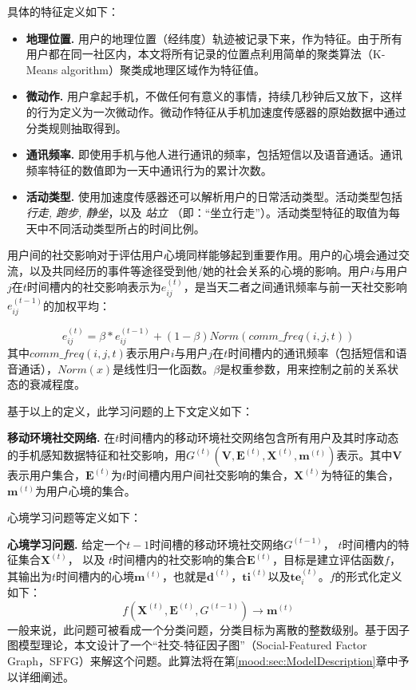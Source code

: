 具体的特征定义如下：
\begin{itemize}
  \item \textbf{地理位置.} 用户的地理位置（经纬度）轨迹被记录下来，作为特征。由于所有用户都在同一社区内，本文将所有记录的位置点利用简单的聚类算法（K-Means algorithm\cite{kmeans}）聚类成地理区域作为特征值。
  \item \textbf{微动作.} 用户拿起手机，不做任何有意义的事情，持续几秒钟后又放下，这样的行为定义为一次微动作。微动作特征从手机加速度传感器的原始数据中通过分类规则抽取得到。
  \item \textbf{通讯频率.} 即使用手机与他人进行通讯的频率，包括短信以及语音通话。通讯频率特征的数值即为一天中通讯行为的累计次数。
  \item \textbf{活动类型.} 使用加速度传感器还可以解析用户的日常活动类型。活动类型包括\textit{行走, 跑步, 静坐}，以及 \textit{站立} （即：``坐立行走''）\cite{activityRecognition}。活动类型特征的取值为每天中不同活动类型所占的时间比例。
\end{itemize}

用户间的社交影响对于评估用户心境同样能够起到重要作用\cite{turner1991social}\cite{eastwick2009game}。用户的心境会通过交流，以及共同经历的事件等途径受到他/她的社会关系的心境的影响。用户$i$与用户$j$在$t$时间槽内的社交影响表示为$e_{ij}^{(t)}$，是当天二者之间通讯频率与前一天社交影响$e_{ij}^{(t-1)}$的加权平均：

\begin{equation}
\label{mood:equ:e}
e_{ij}^{(t)} = \beta \ast e_{ij}^{(t-1)} + (1 - \beta) Norm(comm\_freq(i, j, t))
\end{equation}
其中$comm\_freq(i, j, t)$表示用户$i$与用户$j$在$t$时间槽内的通讯频率（包括短信和语音通话），$Norm(x)$是线性归一化函数。$\beta$是权重参数，用来控制之前的关系状态的衰减程度。

基于以上的定义，此学习问题的上下文定义如下：

\begin{definition}
\textbf{移动环境社交网络.} 在$t$时间槽内的移动环境社交网络包含所有用户及其时序动态的手机感知数据特征和社交影响，用$G^{(t)}(\textbf{V}, \textbf{E}^{(t)}, \textbf{X}^{(t)}, \textbf{m}^{(t)})$表示。其中$\textbf{V}$表示用户集合，$\textbf{E}^{(t)}$为$t$时间槽内用户间社交影响的集合，$\textbf{X}^{(t)}$为特征的集合，$\textbf{m}^{(t)}$为用户心境的集合。
\end{definition}

心境学习问题等定义如下： 

\textbf{心境学习问题.} 给定一个$t-1$时间槽的移动环境社交网络$G^{(t-1)}$， $t$时间槽内的特征集合$\textbf{X}^{(t)}$， 以及 $t$时间槽内的社交影响的集合$\textbf{E}^{(t)}$，目标是建立评估函数$f$，其输出为$t$时间槽内的心境$\textbf{m}^{(t)}$，也就是$\textbf{d}^{(t)}$，$\textbf{ti}^{(t)}$以及$\textbf{te}_i^{(t)}$。$f$的形式化定义如下：
  \[ f(\textbf{X}^{(t)}, \textbf{E}^{(t)}, G^{(t-1)}) \rightarrow \textbf{m}^{(t)}
\]
一般来说，此问题可被看成一个分类问题，分类目标为离散的整数级别。基于因子图模型理论，本文设计了一个``社交-特征因子图''（Social-Featured Factor Graph，SFFG）来解这个问题。此算法将在第\ref{mood:sec:ModelDescription}章中予以详细阐述。

